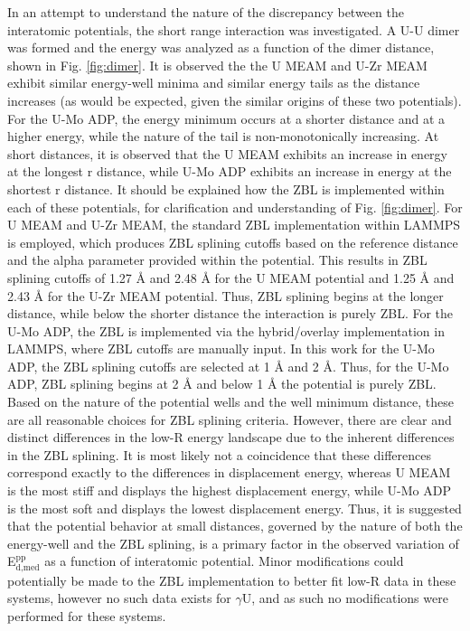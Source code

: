 \documentclass[review]{elsarticle}
\begin{document}
In an attempt to understand the nature of the discrepancy between the interatomic potentials, the short range interaction was investigated. A U-U dimer was formed and the energy was analyzed as a function of the dimer distance, shown in Fig. \ref{fig:dimer}. It is observed the the U MEAM and U-Zr MEAM exhibit similar energy-well minima and similar energy tails as the distance increases (as would be expected, given the similar origins of these two potentials). For the U-Mo ADP, the energy minimum occurs at a shorter distance and at a higher energy, while the nature of the tail is non-monotonically increasing. At short distances, it is observed that the U MEAM exhibits an increase in energy at the longest r distance, while U-Mo ADP exhibits an increase in energy at the shortest r distance. It should be explained how the ZBL is implemented within each of these potentials, for clarification and understanding of Fig. \ref{fig:dimer}. For U MEAM and U-Zr MEAM, the standard ZBL implementation within LAMMPS is employed, which produces ZBL splining cutoffs based on the reference distance and the alpha parameter provided within the potential. This results in ZBL splining cutoffs of 1.27 {\AA} and 2.48 {\AA} for the U MEAM potential and 1.25 {\AA} and 2.43 {\AA} for the U-Zr MEAM potential. Thus, ZBL splining begins at the longer distance, while below the shorter distance the interaction is purely ZBL. For the U-Mo ADP, the ZBL is implemented via the hybrid/overlay implementation in LAMMPS, where ZBL cutoffs are manually input. In this work for the U-Mo ADP, the ZBL splining cutoffs are selected at 1 {\AA} and 2 {\AA}. Thus, for the U-Mo ADP, ZBL splining begins at 2 {\AA} and below 1 {\AA} the potential is purely ZBL. Based on the nature of the potential wells and the well minimum distance, these are all reasonable choices for ZBL splining criteria. However, there are clear and distinct differences in the low-R energy landscape due to the inherent differences in the ZBL splining. It is most likely not a coincidence that these differences correspond exactly to the differences in displacement energy, whereas U MEAM is the most stiff and displays the highest displacement energy, while U-Mo ADP is the most soft and displays the lowest displacement energy. Thus, it is suggested that the potential behavior at small distances, governed by the nature of both the energy-well and the ZBL splining, is a primary factor in the observed variation of E$^{\textrm{pp}}_{\textrm{d,med}}$ as a function of interatomic potential. Minor modifications could potentially be made to the ZBL implementation to better fit low-R data in these systems, however no such data exists for $\gamma$U, and as such no modifications were performed for these systems.
\end{document}

